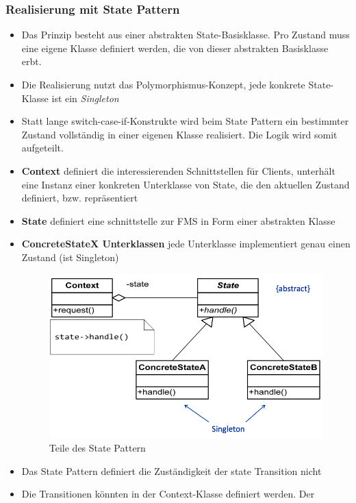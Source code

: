 \subsubsection{Realisierung mit State Pattern}
\begin{itemize}
  \item Das Prinzip besteht aus einer abstrakten State-Basisklasse. Pro Zustand
  muss eine eigene Klasse definiert werden, die von dieser abstrakten
  Basisklasse erbt.
  \item Die Realisierung nutzt das Polymorphismus-Konzept, jede konkrete
  State-Klasse ist ein \textit{Singleton}
  \item Statt lange switch-case-if-Konstrukte wird beim State Pattern ein
  bestimmter Zustand vollständig in einer eigenen Klasse realisiert. Die Logik
  wird somit aufgeteilt.
  \item \textbf{Context} definiert die interessierenden Schnittstellen für
  Clients, unterhält eine Instanz einer konkreten Unterklasse von State, die den
  aktuellen Zustand definiert, bzw. repräsentiert
  \item \textbf{State} definiert eine schnittstelle zur FMS in Form einer
  abstrakten Klasse
  \item \textbf{ConcreteStateX Unterklassen} jede Unterklasse implementiert
  genau einen Zustand (ist Singleton)
 \begin{figure}[h]
  \centering
  {\includegraphics[scale = 0.4]{images/FSM/state_pattern}  
  \caption{Teile des State Pattern}
  \label{fig:state_pattern}}
\end{figure}
\item Das State Pattern definiert die Zuständigkeit der state Transition nicht
\item Die Transitionen könnten in der Context-Klasse definiert werden. Der

\end{itemize}
